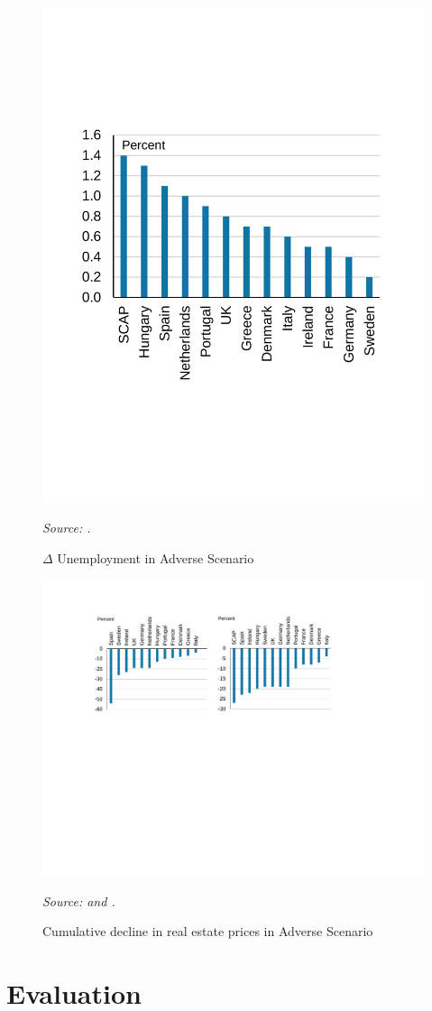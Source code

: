 \documentclass[12pt]{article}
\begin{document}
\begin{figure}[h]
\caption{$\Delta$ Unemployment in Adverse Scenario}\label{unemployment}
\centering
\includegraphics[width=.45\textwidth]{unemployment.pdf}

\raggedright
\textit{\footnotesize Source: \citet{Methodology}.}
\end{figure}

\begin{figure}[h]
\caption{Cumulative decline in real estate prices in Adverse Scenario}\label{REforecast}
\centering
\includegraphics[width=\textwidth]{REforecast.pdf}
\raggedright
\textit{\footnotesize Source: \citet{Methodology} and \citet{SCAPResults}.}
\end{figure}

\section{Evaluation}
\end{document}
